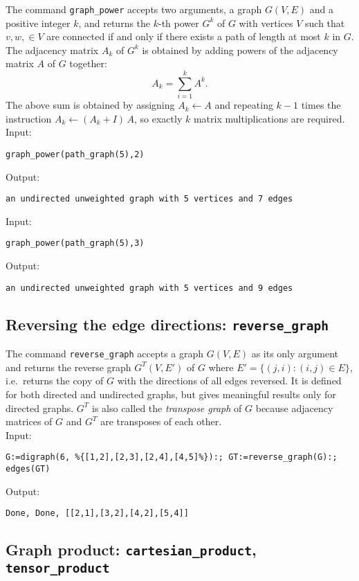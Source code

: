 \documentclass[a4paper,11pt]{article}
\begin{document}
The command {\tt graph\_power} accepts two arguments, a graph $ G(V,E) $ and a positive integer $ k $, and returns the $ k $-th power $ G^k $ of $ G $ with vertices $ V $ such that $ v,w,\in V $ are connected if and only if there exists a path of length at most $ k $ in $ G $. The adjacency matrix $ A_k $ of $ G^k $ is obtained by adding powers of the adjacency matrix $ A $ of $ G $ together:
\[ A_k=\sum_{i=1}^k A^k. \]
The above sum is obtained by assigning $ A_k\leftarrow A $ and repeating $ k-1 $ times the instruction $ A_k\leftarrow (A_k+I)\,A $, so exactly $ k $ matrix multiplications are required.\\
Input:
\begin{center}
  \tt graph\_power(path\_graph(5),2)
\end{center}
Output:
\begin{center}
  \tt an undirected unweighted graph with 5 vertices and 7 edges
\end{center}
Input:
\begin{center}
  \tt graph\_power(path\_graph(5),3)
\end{center}
Output:
\begin{center}
  \tt an undirected unweighted graph with 5 vertices and 9 edges
\end{center}

\subsection{Reversing the edge directions: {\tt reverse\_graph}}

The command {\tt reverse\_graph} accepts a graph $ G(V,E) $ as its only argument and returns the reverse graph $ G^T(V,E') $ of $ G $ where $ E'=\{(j,i):(i,j)\in E\} $, i.e.~returns the copy of $ G $ with the directions of all edges reversed. It is defined for both directed and undirected graphs, but gives meaningful results only for directed graphs. $ G^T $ is also called the \emph{transpose graph} of $ G $ because adjacency matrices of $ G $ and $ G^T $ are transposes of each other.\\
Input:
\begin{center}
  \tt G:=digraph(6, \%\{[1,2],[2,3],[2,4],[4,5]\%\}):; GT:=reverse\_graph(G):; edges(GT)
\end{center}
Output:
\begin{center}
  \tt Done, Done, [[2,1],[3,2],[4,2],[5,4]]
\end{center}

\subsection{Graph product: {\tt cartesian\_product}, {\tt tensor\_product}}
\end{document}
